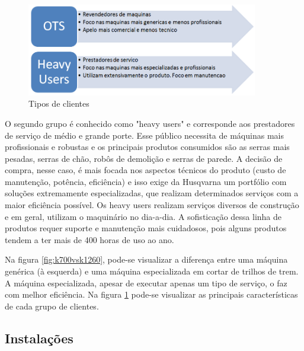 \documentclass[12pt]{article}
\begin{document}
\begin{figure}[h!]
	\centering
	\includegraphics[width=0.9\textwidth]{img/clientes.png}
	\caption{Tipos de clientes}
	\label{fig:tipo-clientes}
\end{figure}

	O segundo grupo é conhecido como "heavy users" e corresponde aos prestadores de serviço de médio e grande porte. Esse público necessita de máquinas mais profissionais e robustas e os principais produtos consumidos são as serras mais pesadas, serras de chão, robôs de demolição e serras de parede. A decisão de compra, nesse caso, é mais focada nos aspectos técnicos do produto (custo de manutenção, potência, eficiência) e isso exige da Husqvarna um portfólio com soluções extremamente especializadas, que realizam determinados serviços com a maior eficiência possível. Os heavy users realizam serviços diversos de construção e em geral, utilizam o maquinário no dia-a-dia. A sofisticação dessa linha de produtos requer suporte e manutenção mais cuidadosos, pois alguns produtos tendem a ter mais de 400 horas de uso ao ano. 
	
	Na figura \ref{fig:k700vsk1260}, pode-se visualizar a diferença entre uma máquina genérica (à esquerda) e uma máquina especializada em cortar de trilhos de trem. A máquina especializada, apesar de executar apenas um tipo de serviço, o faz com melhor eficiência. Na figura \ref{fig:tipo-clientes} pode-se visualizar as principais características de cada grupo de clientes.
	




\subsection{Instalações}
	
\end{document}
